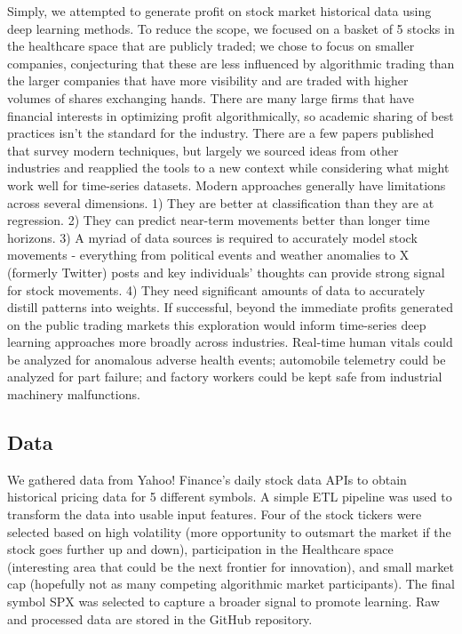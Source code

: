 \documentclass[10pt,twocolumn,letterpaper]{article}
\begin{document}
Simply, we attempted to generate profit on stock market historical data using deep learning methods. To reduce the scope, we focused on a basket of 5 stocks in the healthcare space that are publicly traded; we chose to focus on smaller companies, conjecturing that these are less influenced by algorithmic trading than the larger companies that have more visibility and are traded with higher volumes of shares exchanging hands. 
There are many large firms that have financial interests in optimizing profit algorithmically, so academic sharing of best practices isn’t the standard for the industry. There are a few papers published that survey modern techniques, but largely we sourced ideas from other industries and reapplied the tools to a new context while considering what might work well for time-series datasets.
Modern approaches generally have limitations across several dimensions. 1) They are better at classification than they are at regression. 2) They can predict near-term movements better than longer time horizons. 3) A myriad of data sources is required to accurately model stock movements - everything from political events and weather anomalies to X (formerly Twitter) posts and key individuals’ thoughts can provide strong signal for stock movements. 4) They need significant amounts of data to accurately distill patterns into weights.
If successful, beyond the immediate profits generated on the public trading markets this exploration would inform time-series deep learning approaches more broadly across industries. Real-time human vitals could be analyzed for anomalous adverse health events; automobile telemetry could be analyzed for part failure; and factory workers could be kept safe from industrial machinery malfunctions.



\subsection{Data}

We gathered data from Yahoo! Finance’s daily stock data APIs to obtain historical pricing data for 5 different symbols\cite{yahoo_finance_api,yfinance}. A simple ETL pipeline was used to transform the data into usable input features. Four of the stock tickers were selected based on high volatility (more opportunity to outsmart the market if the stock goes further up and down), participation in the Healthcare space (interesting area that could be the next frontier for innovation), and small market cap (hopefully not as many competing algorithmic market participants). The final symbol SPX was selected to capture a broader signal to promote learning. Raw and processed data are stored in the GitHub repository.
\end{document}
